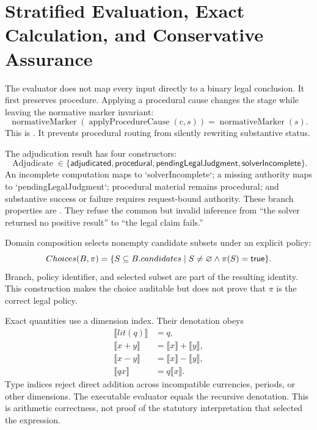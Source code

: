 \section{Stratified Evaluation, Exact Calculation, and Conservative Assurance}
\label{sec:evaluator}

The evaluator does not map every input directly to a binary legal conclusion. It first preserves procedure. Applying a procedural cause changes the stage while leaving the normative marker invariant:
\begin{equation}
\operatorname{normativeMarker}(\operatorname{applyProcedureCause}(c,s))
=\operatorname{normativeMarker}(s).
\label{eq:procedure-preserves-marker}
\end{equation}
This is \formalized{}. It prevents procedural routing from silently rewriting substantive status.

The adjudication result has four constructors:
\begin{equation}
\operatorname{Adjudicate}\in
\{\mathsf{adjudicated},\mathsf{procedural},
\mathsf{pendingLegalJudgment},\mathsf{solverIncomplete}\}.
\label{eq:adjudication-four-way}
\end{equation}
An incomplete computation maps to `solverIncomplete`; a missing authority maps to `pendingLegalJudgment`; procedural material remains procedural; and substantive success or failure requires request-bound authority. These branch properties are \formalized{}. They refuse the common but invalid inference from “the solver returned no positive result” to “the legal claim fails.”

Domain composition selects nonempty candidate subsets under an explicit policy:
\begin{equation}
Choices(B,\pi)=\{S\subseteq B.candidates\mid
S\neq\varnothing\land\pi(S)=\mathsf{true}\}.
\label{eq:composition-choices}
\end{equation}
Branch, policy identifier, and selected subset are part of the resulting identity. This \formalized{} construction makes the choice auditable but does not prove that $\pi$ is the correct legal policy.

Exact quantities use a dimension index. Their denotation obeys
\begin{align}
\llbracket lit(q)\rrbracket&=q,\label{eq:eval-lit}\\
\llbracket x+y\rrbracket&=\llbracket x\rrbracket+\llbracket y\rrbracket,
\label{eq:eval-add}\\
\llbracket x-y\rrbracket&=\llbracket x\rrbracket-\llbracket y\rrbracket,
\label{eq:eval-sub}\\
\llbracket qx\rrbracket&=q\llbracket x\rrbracket.
\label{eq:eval-scale}
\end{align}
Type indices reject direct addition across incompatible currencies, periods, or other dimensions. The executable evaluator equals the recursive denotation. This is \formalized{} arithmetic correctness, not proof of the statutory interpretation that selected the expression.

